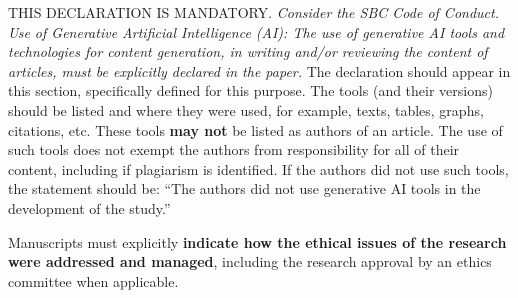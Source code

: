 \documentclass[english]{sbcreviews-2025}%
\begin{document}
\begin{declarations}
\begin{aitools}
THIS DECLARATION IS MANDATORY. 
\textit{Consider the SBC Code of Conduct.
Use of Generative Artificial Intelligence (AI):
The use of generative AI tools and technologies for content generation,
in writing and/or reviewing the content of articles, must be explicitly declared in the paper.}
The declaration should appear in this section, specifically defined for this purpose.
The tools (and their versions) should be listed and where they were used, for example,
texts, tables, graphs, citations, etc.
These tools \textbf{may not} be listed as authors of an article.
The use of such tools does not exempt the authors from responsibility
for all of their content, including if plagiarism is identified.
%
If the authors did not use such tools, the statement should be:
``The authors did not use generative AI tools in the development of the study.''
\end{aitools}

\begin{furtherinformation}
Manuscripts must explicitly 
\textbf{indicate how the ethical issues of the research were addressed and managed}, 
including the research approval by an ethics committee when applicable. 
\end{furtherinformation}

\end{declarations}



\end{document}
